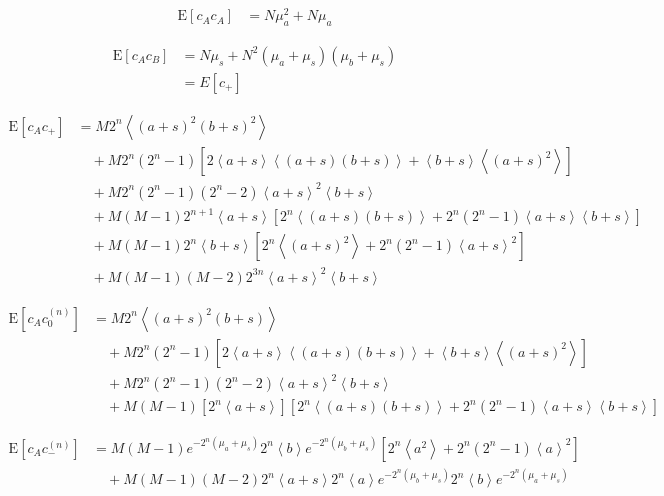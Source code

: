 \documentclass{article}
\begin{document}

\begin{align}
    \mathrm{E}[c_A c_A]
        & = N \mu_a^2 + N \mu_a
\end{align}


\begin{align}
    \mathrm{E}[c_A c_B]
        & = N \mu_s + N^2 (\mu_a + \mu_s)(\mu_b + \mu_s) \\
        & = E[c_+] \nonumber
\end{align}


\begin{align}
    \mathrm{E}[c_A c_+]
        & = M 2^n \left<(a+s)^2 (b+s)^2\right> \nonumber \\
        & \quad + M 2^n (2^n-1) \left[ 2\left<a+s\right>\left<(a+s)(b+s)\right> + \left<b+s\right>\left<(a+s)^2\right>\right] \nonumber \\
        & \quad + M 2^n (2^n-1) (2^n-2) \left<a+s\right>^2 \left<b+s\right> \nonumber \\
        & \quad + M (M-1) 2^{n+1} \left<a+s\right> \left[ 2^n\left<(a+s)(b+s)\right> + 2^n(2^n-1)\left<a+s\right>\left<b+s\right>\right] \nonumber \\
        & \quad + M (M-1) 2^{n} \left<b+s\right> \left[ 2^n\left<(a+s)^2\right> + 2^n(2^n-1)\left<a+s\right>^2\right] \nonumber \\
        & \quad + M (M-1) (M-2) 2^{3n} \left<a+s\right>^2 \left<b+s\right>
\end{align}


\begin{align}
    \mathrm{E}[c_A c_0^{(n)}]
        & = M 2^n \left<(a+s)^2(b+s)\right> \nonumber \\
        & \quad + M 2^n (2^n-1) \left[ 2\left<a+s\right>\left<(a+s)(b+s)\right> + \left<b+s\right>\left<(a+s)^2\right> \right] \nonumber \\
        & \quad + M 2^n (2^n-1) (2^n-2) \left<a+s\right>^2 \left<b+s\right> \nonumber \\
        & \quad + M (M-1) [2^n \left<a+s\right>] [2^n \left<(a+s)(b+s)\right> + 2^n (2^n-1) \left<a+s\right>\left<b+s\right>]
\end{align}


\begin{align}
    \mathrm{E}[c_A c_{-}^{(n)}]
        & = M (M-1) e^{-2^n(\mu_a + \mu_s)} 2^n \left<b\right> e^{-2^n(\mu_b+\mu_s)} [ 2^n\left<a^2\right> + 2^n (2^n-1)\left<a\right>^2 ] \nonumber \\
        & \quad + M (M-1) (M-2) 2^n \left<a+s\right> 2^n \left<a\right> e^{-2^n(\mu_b+\mu_s)} 2^n \left<b\right> e^{-2^n(\mu_a+\mu_s)}
\end{align}
\end{document}
